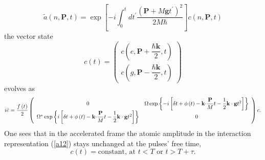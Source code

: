\documentclass[twocolumn,showpacs,preprintnumbers]{revtex4}
\begin{document}
\begin{equation}
\tilde{a}\left( n,\mathbf{P},t\right) =\exp \left[ -i\int_{0}^{t}dt^{\prime }%
\dfrac{\left( \mathbf{P}+M\mathbf{g}t^{\prime }\right) ^{2}}{2M\hbar }\right]
c\left( n,\mathbf{P},t\right)  \label{a12}
\end{equation}%
the vector state%
\begin{equation}
c\left( t\right) =\left( 
\begin{array}{c}
c\left( e,\mathbf{P}+\dfrac{\hbar \mathbf{k}}{2},t\right) \\ 
c\left( g,\mathbf{P}-\dfrac{\hbar \mathbf{k}}{2},t\right)%
\end{array}%
\right)  \label{a13}
\end{equation}%
evolves as%
\begin{equation}
i\dot{c}=\dfrac{f\left( t\right) }{2}\left( 
\begin{array}{cc}
0 & \Omega \exp \left\{ -i\left[ \delta t+\phi \left( t\right) -\mathbf{%
k\cdot }\dfrac{\mathbf{P}}{M}t-\dfrac{1}{2}\mathbf{k\cdot g}t^{2}\right]
\right\} \\ 
\Omega ^{\ast }\exp \left\{ i\left[ \delta t+\phi \left( t\right) -\mathbf{%
k\cdot }\dfrac{\mathbf{P}}{M}t-\dfrac{1}{2}\mathbf{k\cdot g}t^{2}\right]
\right\} & 0%
\end{array}%
\right) c.  \label{a14}
\end{equation}%
One sees that in the accelerated frame the atomic amplitude in the
interaction representation (\ref{a12}) stays unchanged at the pulses' free
time,%
\begin{equation}
c\left( t\right) =\text{constant, at }t<T\text{ or }t>T+\tau .  \label{a14.1}
\end{equation}
\end{document}
